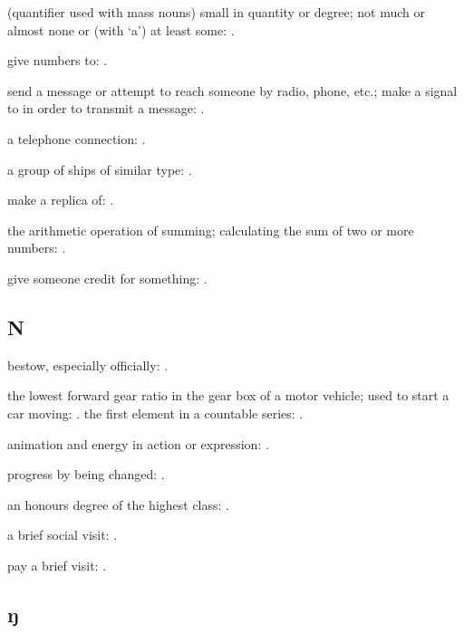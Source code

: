   (quantifier used with mass nouns) small in quantity or degree; not much or almost none or (with `a') at least some:   .

  give numbers to: .

  send a message or attempt to reach someone by radio, phone, etc.; make a signal to in order to transmit a message: .

  a telephone connection:   .

  a group of ships of similar type:   .

  make a replica of:   .

  the arithmetic operation of summing; calculating the sum of two or more numbers:   .

  give someone credit for something: .

\subsection*{N}

  bestow, especially officially:   .

  the lowest forward gear ratio in the gear box of a motor vehicle; used to start a car moving:   . the first element in a countable series:   .

  animation and energy in action or expression:   .

  progress by being changed:   .

  an honours degree of the highest class:   .

  a brief social visit: .

  pay a brief visit:   .

\subsection*{ŋ}

